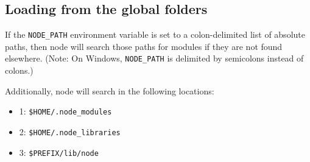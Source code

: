 \begin{Shaded}
\begin{Highlighting}[]
 \NormalTok{=}
    \NormalTok{:}

  
    
  
  \NormalTok{= []}
  
    \NormalTok{[I] = } 
    \NormalTok{(PARTS[} \NormalTok{] + }\NormalTok{)}
    
     
 
\end{Highlighting}
\end{Shaded}

\subsection{Loading from the global
folders}\label{loading-from-the-global-folders}

If the \texttt{NODE\_PATH} environment variable is set to a
colon-delimited list of absolute paths, then node will search those
paths for modules if they are not found elsewhere. (Note: On Windows,
\texttt{NODE\_PATH} is delimited by semicolons instead of colons.)

Additionally, node will search in the following locations:

\begin{itemize}
\itemsep1pt\parskip0pt
\item
  1: \texttt{\$HOME/.node\_modules}
\item
  2: \texttt{\$HOME/.node\_libraries}
\item
  3: \texttt{\$PREFIX/lib/node}
\end{itemize}

